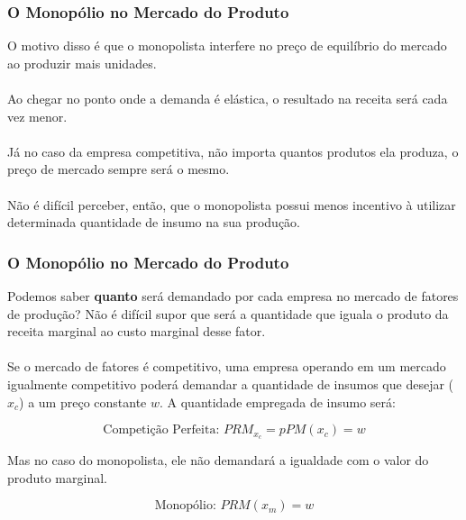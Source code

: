 \documentclass{beamer}[10]
\begin{document}
\begin{frame}
	\frametitle{O Monopólio no Mercado do Produto}

	O motivo disso é que o monopolista interfere no preço de equilíbrio do mercado ao produzir mais unidades. 
	\\~\\
	Ao chegar no ponto onde a demanda é elástica, o resultado na receita será cada vez menor. 
	\\~\\
	Já no caso da empresa competitiva, não importa quantos produtos ela produza, o preço de mercado sempre será o mesmo.
	\\~\\
	Não é difícil perceber, então, que o monopolista possui menos incentivo à utilizar determinada quantidade de insumo na sua produção.

\end{frame}

\begin{frame}
	\frametitle{O Monopólio no Mercado do Produto}

	Podemos saber \textbf{quanto} será demandado por cada empresa no mercado de fatores de produção? Não é difícil supor que será a quantidade que iguala o produto da receita marginal ao custo marginal desse fator.
	\\~\\
	Se o mercado de fatores é competitivo, uma empresa operando em um mercado igualmente competitivo poderá demandar a quantidade de insumos que desejar ($x_c$) a um preço constante $w$. A quantidade empregada de insumo será:

	$$ \textrm{Competição Perfeita: } PRM_{x_c} = pPM(x_c) = w $$

	Mas no caso do monopolista, ele não demandará a igualdade com o valor do produto marginal.

	$$ \textrm{Monopólio: } PRM(x_m) = w $$
\end{frame}
\end{document}
